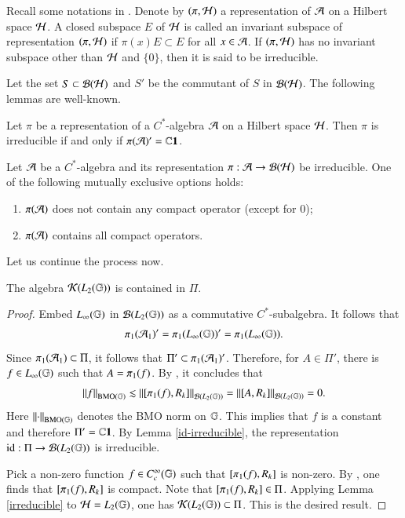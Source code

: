 \documentclass[leqno]{amsart}
\begin{document}
	
	
	Recall some notations in \cite{Dixmier-book}.
	Denote by $(\pi,{\mathcal H})$ a representation of ${\mathcal A}$ on a Hilbert space ${\mathcal H}$. A closed subspace $E$ of ${\mathcal H}$ is called an invariant subspace of representation $(\pi,{\mathcal H})$ if $\pi(x)E\subset E$ for all $x\in{\mathcal A}$. If $(\pi,{\mathcal H})$ has no invariant subspace other than ${\mathcal H}$ and $\{0\}$, then it is said to be irreducible.
	
	Let the set $S\subset{\mathcal B}({\mathcal H})$ and $S'$ be the commutant of $S$ in ${\mathcal B}({\mathcal H})$. 
	The following lemmas are well-known. 
	\begin{lemma}\label{id-irreducible}
		\cite[Proposition II.6.1.8]{Blackadar-book}
		Let $\pi$ be a representation of a $C^{*}$-algebra ${\mathcal A}$ on a Hilbert space ${\mathcal H}$. Then
		$\pi$ is irreducible if and only if $\pi({\mathcal A})'=\mathbb{C}\mathbf 1$.
	\end{lemma}
	
	
	\begin{lemma}\label{irreducible}
		\cite[Corollary 4.1.10]{Dixmier-book}
		Let ${\mathcal A}$ be a $C^{*}$-algebra and its representation $\pi:{\mathcal A}\rightarrow{\mathcal B}({\mathcal H})$ be irreducible. 
		One of the following mutually exclusive options holds:
		\begin{enumerate}[\rm(1)]
			\item $\pi({\mathcal A})$ does not contain any compact operator (except for 0);
			
			\item $\pi({\mathcal A})$ contains all compact operators. 
		\end{enumerate}
	\end{lemma}
	
	
	
	
	Let us continue the process now.
	\begin{lemma}\label{containalg}
		The algebra ${\mathcal K}(L_{2}(\mathbb{G}))$ is contained in $\Pi$.
	\end{lemma}
	\begin{proof}
		Embed $L_{\infty}(\mathbb{G})$ in ${\mathcal B}(L_{2}(\mathbb{G}))$ as a commutative $C^{*}$-subalgebra. It follows that
		\begin{align*}
			\pi_{1}({\mathcal A}_{1})'=\pi_{1}(L_{\infty}(\mathbb{G}))'=\pi_{1}(L_{\infty}(\mathbb{G})).
		\end{align*}
		Since $\pi_{1}({\mathcal A}_{1})\subset\Pi$, it follows that $\Pi'\subset\pi_{1}({\mathcal A}_{1})'$. 
		Therefore, for $A\in\Pi'$, there is $f\in L_{\infty}(\mathbb{G})$ such that $A=\pi_{1}(f)$. 
		By \cite[Thm 1.2]{DLLW2019}, it concludes that
		\begin{align*}
			\left\| f \right\|_{{\rm BMO}(\mathbb{G})}\lesssim\left\| [\pi_{1}(f),{ R}_{k}] \right\|_{{\mathcal B}(L_{2}(\mathbb{G}))}=\left\| [A,{ R}_{k}] \right\|_{{\mathcal B}(L_{2}(\mathbb{G}))}=0.
		\end{align*}
		Here $\left\| \cdot \right\|_{{\rm BMO}(\mathbb{G})}$ denotes the BMO norm on $\mathbb{G}$.
		This implies that $f$ is a constant and therefore $\Pi'=\mathbb{C}\mathbf 1$. By Lemma \ref{id-irreducible}, the representation ${\rm id}:\Pi\rightarrow{\mathcal B}(L_{2}(\mathbb{G}))$ is irreducible.
		
		Pick a non-zero function $f\in C_{c}^{\infty}(\mathbb{G})$ such that $[\pi_{1}(f),{ R}_{k}]$ is non-zero. By \cite{CDLW2019}, one finds that $[\pi_{1}(f),{ R}_{k}]$ is compact. Note that $[\pi_{1}(f),{ R}_{k}]\in\Pi$. Applying Lemma \ref{irreducible} to ${\mathcal H}=L_{2}(\mathbb{G})$, one has ${\mathcal K}(L_{2}(\mathbb{G}))\subset\Pi$. This is the desired result.
	\end{proof}
	
\end{document}
